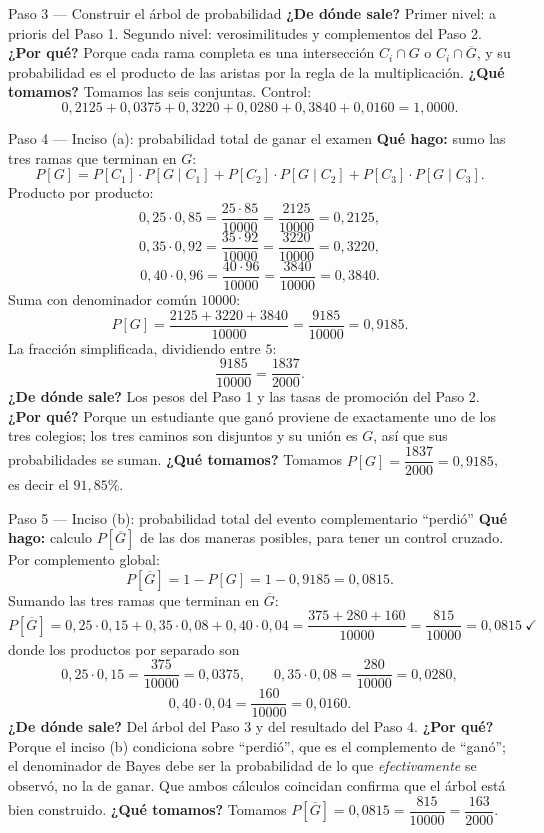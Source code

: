 \documentclass[11pt]{article}
\begin{document}
\begin{sol}
\begin{paso}{Paso 3 --- Construir el \'arbol de probabilidad}
\textbf{¿De d\'onde sale?} Primer nivel: a prioris del Paso 1. Segundo nivel: verosimilitudes y complementos del Paso 2.
\textbf{¿Por qu\'e?} Porque cada rama completa es una intersecci\'on $C_i\cap G$ o $C_i\cap\overline{G}$, y su probabilidad es el producto de las aristas por la regla de la multiplicaci\'on.
\textbf{¿Qu\'e tomamos?} Tomamos las seis conjuntas. Control:
\[
0{,}2125+0{,}0375+0{,}3220+0{,}0280+0{,}3840+0{,}0160=1{,}0000 .
\]
\end{paso}

\begin{paso}{Paso 4 --- Inciso (a): probabilidad total de ganar el examen}
\textbf{Qu\'e hago:} sumo las tres ramas que terminan en $G$:
\[
P[G]=P[C_1]\cdot P[G\mid C_1]+P[C_2]\cdot P[G\mid C_2]+P[C_3]\cdot P[G\mid C_3].
\]
Producto por producto:
\[
0{,}25\cdot 0{,}85=\frac{25\cdot 85}{10000}=\frac{2125}{10000}=0{,}2125,
\]
\[
0{,}35\cdot 0{,}92=\frac{35\cdot 92}{10000}=\frac{3220}{10000}=0{,}3220,
\]
\[
0{,}40\cdot 0{,}96=\frac{40\cdot 96}{10000}=\frac{3840}{10000}=0{,}3840 .
\]
Suma con denominador com\'un $10000$:
\[
P[G]=\frac{2125+3220+3840}{10000}=\frac{9185}{10000}=0{,}9185 .
\]
La fracci\'on simplificada, dividiendo entre $5$:
\[
\frac{9185}{10000}=\frac{1837}{2000}.
\]
\textbf{¿De d\'onde sale?} Los pesos del Paso 1 y las tasas de promoci\'on del Paso 2.
\textbf{¿Por qu\'e?} Porque un estudiante que gan\'o proviene de exactamente uno de los tres colegios; los tres caminos son disjuntos y su uni\'on es $G$, as\'i que sus probabilidades se suman.
\textbf{¿Qu\'e tomamos?} Tomamos $P[G]=\dfrac{1837}{2000}=0{,}9185$, es decir el $91{,}85\%$.
\end{paso}

\begin{paso}{Paso 5 --- Inciso (b): probabilidad total del evento complementario ``perdi\'o''}
\textbf{Qu\'e hago:} calculo $P[\overline{G}]$ de las dos maneras posibles, para tener un control cruzado. Por complemento global:
\[
P[\overline{G}]=1-P[G]=1-0{,}9185=0{,}0815 .
\]
Sumando las tres ramas que terminan en $\overline{G}$:
\[
P[\overline{G}]=0{,}25\cdot 0{,}15+0{,}35\cdot 0{,}08+0{,}40\cdot 0{,}04
=\frac{375+280+160}{10000}=\frac{815}{10000}=0{,}0815\ \checkmark
\]
donde los productos por separado son
\[
0{,}25\cdot 0{,}15=\frac{375}{10000}=0{,}0375,\qquad
0{,}35\cdot 0{,}08=\frac{280}{10000}=0{,}0280,
\]
\[
0{,}40\cdot 0{,}04=\frac{160}{10000}=0{,}0160 .
\]
\textbf{¿De d\'onde sale?} Del \'arbol del Paso 3 y del resultado del Paso 4.
\textbf{¿Por qu\'e?} Porque el inciso (b) condiciona sobre ``perdi\'o'', que es el complemento de ``gan\'o''; el denominador de Bayes debe ser la probabilidad de lo que \emph{efectivamente} se observ\'o, no la de ganar. Que ambos c\'alculos coincidan confirma que el \'arbol est\'a bien construido.
\textbf{¿Qu\'e tomamos?} Tomamos $P[\overline{G}]=0{,}0815=\dfrac{815}{10000}=\dfrac{163}{2000}$.
\end{paso}


\end{sol}
\end{document}
